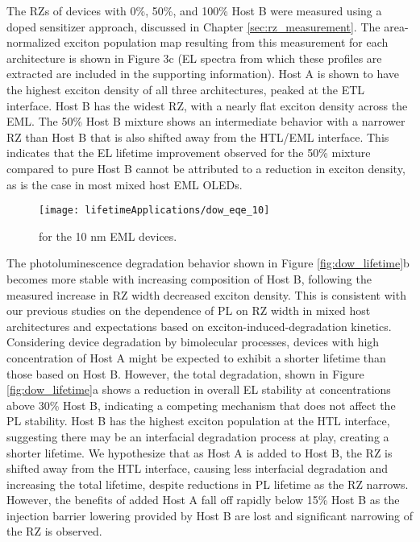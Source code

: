 \documentclass[../thesis.tex]{subfiles}
\begin{document}
The RZs of devices with 0\%, 50\%, and 100\% Host B were measured using a doped sensitizer approach, discussed in Chapter \ref{sec:rz_measurement}.\supercite{Bangsund2018}
The area-normalized exciton population map resulting from this measurement for each architecture is shown in Figure 3c (EL spectra from which these profiles are extracted are included in the supporting information). 
Host A is shown to have the highest exciton density of all three architectures, peaked at the ETL interface. 
Host B has the widest RZ, with a nearly flat exciton density across the EML. 
The 50\% Host B mixture shows an intermediate behavior with a narrower RZ than Host B that is also shifted away from the HTL/EML interface. 
This indicates that the EL lifetime improvement observed for the 50\% mixture compared to pure Host B cannot be attributed to a reduction in exciton density, as is the case in most mixed host EML OLEDs. 


\begin{wrapfigure}{r}{.5\textwidth}
\centering
\texttt{[image: lifetimeApplications/dow\_eqe\_10]}
\caption{\eqe for the 10 nm EML devices.}
\label{fig:dow_eqe_10}
\end{wrapfigure}
The photoluminescence degradation behavior shown in Figure \ref{fig:dow_lifetime}b becomes more stable with increasing composition of Host B, following the measured increase in RZ width decreased exciton density. 
This is consistent with our previous studies on the dependence of PL on RZ width in mixed host architectures and expectations based on exciton-induced-degradation kinetics.\supercite{Bangsund2018,Giebink2008a} 
Considering device degradation by bimolecular processes, devices with high concentration of Host A might be expected to exhibit a shorter lifetime than those based on Host B. 
However, the total degradation, shown in Figure \ref{fig:dow_lifetime}a shows a reduction in overall EL stability at concentrations above 30\% Host B, indicating a competing mechanism that does not affect the PL stability.  
Host B has the highest exciton population at the HTL interface, suggesting there may be an interfacial degradation process at play, creating a shorter lifetime.\supercite{Hershey2017,Wang2013} 
We hypothesize that as Host A is added to Host B, the RZ is shifted away from the HTL interface, causing less interfacial degradation and increasing the total lifetime, despite reductions in PL lifetime as the RZ narrows. 
However, the benefits of added Host A fall off rapidly below 15\% Host B as the injection barrier lowering provided by Host B are lost and significant narrowing of the RZ is observed.
\end{document}
